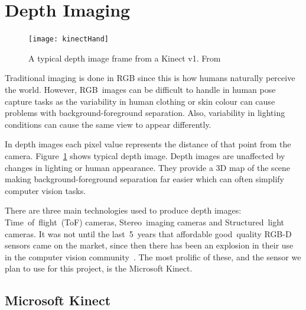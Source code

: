 \documentclass[11pt]{article} %
\begin{document}
\section{Depth Imaging}
\label{sec:Depth}
\begin{figure}
\texttt{[image: kinectHand]}
\caption{A typical depth image frame from a Kinect v1. From~\cite{Chen2013}		\label{fig:kinectHand}  } 
\end{figure}

Traditional imaging is done in RGB since this is how humans naturally perceive the world. However, RGB~images can be difficult to handle in human pose capture tasks as the variability in human clothing or skin colour can cause problems with background-foreground separation. Also, variability in lighting conditions can cause the same view to appear differently. 

In depth images each pixel value represents the distance of that point from the camera. Figure~\ref{fig:kinectHand} shows typical depth image. Depth images are unaffected by changes in lighting or human appearance. They provide a 3D map of the scene making background-foreground separation far easier which can often simplify computer vision tasks.\cite{Chen2013}


There are three main technologies used to produce depth images: Time~of~flight~(ToF) cameras, Stereo~imaging cameras and Structured~light cameras. It was not until the last~5~years that affordable good~quality RGB-D sensors came on the market, since then there has been an explosion in their use in the computer vision community~\cite{Han2013}. The most prolific of these, and the sensor we plan to use for this project, is the Microsoft Kinect.
 
\subsection{Microsoft Kinect}
\end{document}
